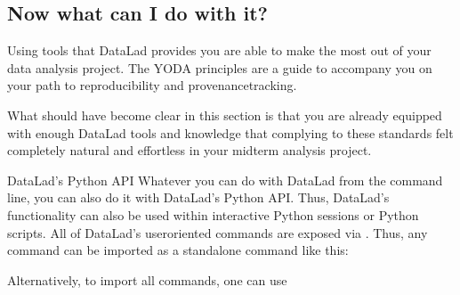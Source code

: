 \subsection{Now what can I do with it?}
\label{\detokenize{basics/101-128-summary_yoda:now-what-can-i-do-with-it}}
\sphinxAtStartPar
Using tools that DataLad provides you are able to make the most out of
your data analysis project. The YODA principles are a guide to accompany
you on your path to reproducibility and provenance\sphinxhyphen{}tracking.

\sphinxAtStartPar
What should have become clear in this section is that you are already
equipped with enough DataLad tools and knowledge that complying to these
standards felt completely natural and effortless in your midterm analysis
project.


\ignorespaces {}\label{\detokenize{basics/101-130-yodaproject:pythonapi}}\begin{findoutmore}[label={fom-pythonapi}, before title={\thetcbcounter\ }, float, check odd page=true]{DataLad’s Python API}
\label{\detokenize{basics/101-130-yodaproject:fom-pythonapi}}
\label{\detokenize{basics/101-130-yodaproject:python}}
\sphinxAtStartPar
Whatever you can do with DataLad from the command line, you can also do it with
DataLad’s Python API.
Thus, DataLad’s functionality can also be used within interactive Python sessions
or Python scripts.
All of DataLad’s user\sphinxhyphen{}oriented commands are exposed via .
Thus, any command can be imported as a stand\sphinxhyphen{}alone command like this:

\begin{sphinxVerbatim}[commandchars=\\\{\}]
   
\end{sphinxVerbatim}

\sphinxAtStartPar
Alternatively, to import all commands, one can use

\begin{sphinxVerbatim}[commandchars=\\\{\}]
   
\end{sphinxVerbatim}


\end{findoutmore}
